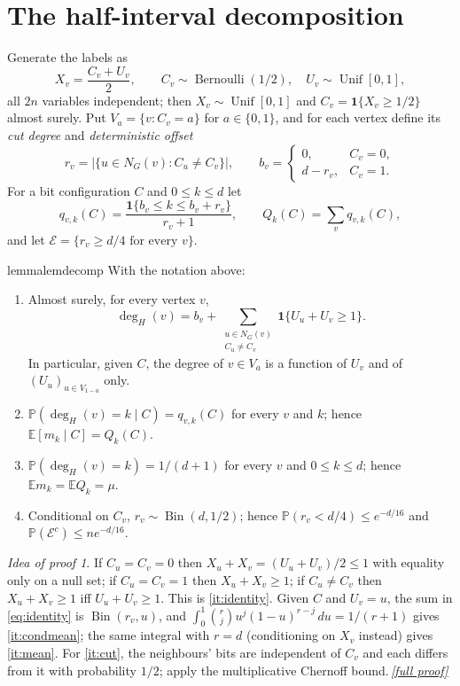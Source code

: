 \documentclass[11pt,a4paper]{article}
\theoremstyle{plain}
\theoremstyle{definition}
\theoremstyle{remark}
\newtheorem*{proofidea}{Idea of proof}
\newcommand{\fullproofref}[1]{\,\hyperref[#1]{\textit{[full proof]}}}
\newcommand{\EE}{\mathbb E}
\newcommand{\PP}{\mathbb P}
\newcommand{\ind}{\mathbf 1}
\newcommand{\Unif}{\operatorname{Unif}}
\newcommand{\Bin}{\operatorname{Bin}}
\newcommand{\Ber}{\operatorname{Bernoulli}}
\newcommand{\cE}{\mathcal E}
\newcommand{\degH}{\deg_H}
\begin{document}
\section{The half-interval decomposition}\label{sec:decomp}

Generate the labels as
\[
 X_v=\frac{C_v+U_v}2,\qquad C_v\sim\Ber(1/2),\quad U_v\sim\Unif[0,1],
\]
all $2n$ variables independent; then $X_v\sim\Unif[0,1]$ and $C_v=\ind\{X_v\ge1/2\}$ almost surely. Put $V_a=\{v:C_v=a\}$ for $a\in\{0,1\}$, and for each vertex define its \emph{cut degree} and \emph{deterministic offset}
\[
 r_v=|\{u\in N_G(v):C_u\ne C_v\}|,\qquad
 b_v=\begin{cases}0,&C_v=0,\\ d-r_v,&C_v=1.\end{cases}
\]
For a bit configuration $C$ and $0\le k\le d$ let
\begin{equation}\label{eq:q}
 q_{v,k}(C)=\frac{\ind\{b_v\le k\le b_v+r_v\}}{r_v+1},\qquad Q_k(C)=\sum_v q_{v,k}(C),
\end{equation}
and let $\cE=\{r_v\ge d/4\text{ for every }v\}$.

\begin{restatable}{lemma}{lemdecomp}\label{lem:decomp}
With the notation above:
\begin{enumerate}[label=\textup{(\alph*)},itemsep=1pt]
\item\label{it:identity} Almost surely, for every vertex $v$,
\begin{equation}\label{eq:identity}
 \degH(v)=b_v+\sum_{\substack{u\in N_G(v)\\ C_u\ne C_v}}\ind\{U_u+U_v\ge1\}.
\end{equation}
In particular, given $C$, the degree of $v\in V_a$ is a function of $U_v$ and of $(U_u)_{u\in V_{1-a}}$ only.
\item\label{it:condmean} $\PP(\degH(v)=k\mid C)=q_{v,k}(C)$ for every $v$ and $k$; hence $\EE[m_k\mid C]=Q_k(C)$.
\item\label{it:mean} $\PP(\degH(v)=k)=1/(d+1)$ for every $v$ and $0\le k\le d$; hence $\EE m_k=\EE Q_k=\mu$.
\item\label{it:cut} Conditional on $C_v$, $r_v\sim\Bin(d,1/2)$; hence $\PP(r_v<d/4)\le e^{-d/16}$ and $\PP(\cE^c)\le ne^{-d/16}$.
\end{enumerate}
\end{restatable}

\begin{proofidea}
If $C_u=C_v=0$ then $X_u+X_v=(U_u+U_v)/2\le1$ with equality only on a null set; if $C_u=C_v=1$ then $X_u+X_v\ge1$; if $C_u\ne C_v$ then $X_u+X_v\ge1$ iff $U_u+U_v\ge1$. This is \ref{it:identity}. Given $C$ and $U_v=u$, the sum in \eqref{eq:identity} is $\Bin(r_v,u)$, and $\int_0^1\binom rj u^j(1-u)^{r-j}\,du=1/(r+1)$ gives \ref{it:condmean}; the same integral with $r=d$ (conditioning on $X_v$ instead) gives \ref{it:mean}. For \ref{it:cut}, the neighbours' bits are independent of $C_v$ and each differs from it with probability $1/2$; apply the multiplicative Chernoff bound.\fullproofref{pf:decomp}
\end{proofidea}
\end{document}

